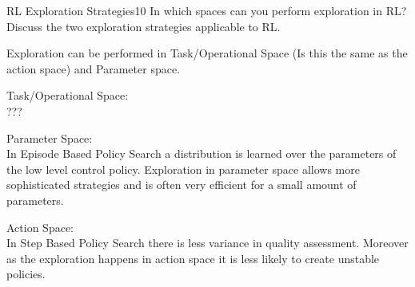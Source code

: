 
\begin{questions}
	

\begin{question}{RL Exploration Strategies}{10}
	In which spaces can you perform exploration in RL? Discuss the two  exploration strategies applicable to RL.
	
\begin{answer}
Exploration can be performed in Task/Operational Space (Is this the same as the action space) and Parameter space.

Task/Operational Space:\\
???

Parameter Space:\\
In Episode Based Policy Search a distribution is learned over the parameters of the low level control policy. Exploration in parameter space allows more sophisticated strategies and is often very efficient for a small amount of parameters. 

Action Space:\\
In Step Based Policy Search there is less variance in quality assessment. Moreover as the exploration happens in action space it is less likely to create unstable policies.
\end{answer}
\end{question}




\end{questions}